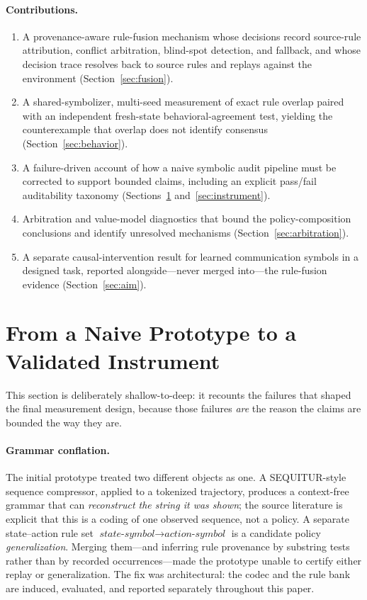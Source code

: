 \documentclass[11pt]{article}
\begin{document}
\paragraph{Contributions.}
\begin{enumerate}
\item A provenance-aware rule-fusion mechanism whose decisions record source-rule attribution,
conflict arbitration, blind-spot detection, and fallback, and whose decision trace resolves back
to source rules and replays against the environment (Section~\ref{sec:fusion}).
\item A shared-symbolizer, multi-seed measurement of exact rule overlap paired with an
independent fresh-state behavioral-agreement test, yielding the counterexample that overlap does
not identify consensus (Section~\ref{sec:behavior}).
\item A failure-driven account of how a naive symbolic audit pipeline must be corrected to
support bounded claims, including an explicit pass/fail auditability taxonomy
(Sections~\ref{sec:pipeline} and~\ref{sec:instrument}).
\item Arbitration and value-model diagnostics that bound the policy-composition conclusions and
identify unresolved mechanisms (Section~\ref{sec:arbitration}).
\item A separate causal-intervention result for learned communication symbols in a designed task,
reported alongside---never merged into---the rule-fusion evidence (Section~\ref{sec:aim}).
\end{enumerate}

\section{From a Naive Prototype to a Validated Instrument}
\label{sec:pipeline}

This section is deliberately shallow-to-deep: it recounts the failures that shaped the final
measurement design, because those failures \emph{are} the reason the claims are bounded the way
they are.

\paragraph{Grammar conflation.}
The initial prototype treated two different objects as one. A SEQUITUR-style sequence
compressor, applied to a tokenized trajectory, produces a context-free grammar that can
\emph{reconstruct the string it was shown}; the source literature is explicit that this is a
coding of one observed sequence, not a policy. A separate state--action rule set
$\textit{state-symbol}\!\rightarrow\!\textit{action-symbol}$ is a candidate policy
\emph{generalization}. Merging them---and inferring rule provenance by substring tests rather
than by recorded occurrences---made the prototype unable to certify either replay or
generalization. The fix was architectural: the codec and the rule bank are induced, evaluated,
and reported separately throughout this paper.
\end{document}
